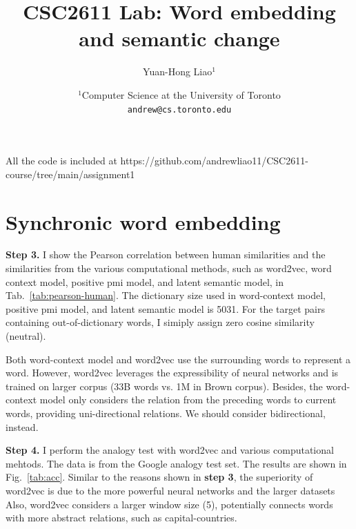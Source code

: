\documentclass[a4paper]{article}
\title{CSC2611 Lab: Word embedding and semantic change}
\author{Yuan-Hong Liao$^{1}$}
\date{
	$^1$Computer Science at the University of Toronto \\ \texttt{andrew@cs.toronto.edu}
}
\theoremstyle{plain}
\theoremstyle{definition}
\begin{document}
\maketitle


\noindent All the code is included at https://github.com/andrewliao11/CSC2611-course/tree/main/assignment1

\section{Synchronic word embedding}

\noindent\textbf{Step 3.}
I show the Pearson correlation between human similarities and the similarities from the various computational methods, such as word2vec, word context model, positive pmi model, and latent semantic model, in Tab.~\ref{tab:pearson-human}.
The dictionary size used in word-context model, positive pmi model, and latent semantic model is 5031. For the target pairs containing out-of-dictionary words, I simiply assign zero cosine similarity (neutral).

Both word-context model and word2vec use the surrounding words to represent a word. However, word2vec leverages the expressibility of neural networks and is trained on larger corpus (33B words vs. 1M in Brown corpus).
Besides, the word-context model only considers the relation from the preceding words to current words, providing uni-directional relations. We should consider bidirectional, instead.

\begin{table}[h]
\caption{Pearson correlation w.r.t. human similarities.}
\label{tab:pearson-human}
\end{table}


\noindent\textbf{Step 4.} I perform the analogy test with word2vec and various computational mehtods. The data is from the Google analogy test set. 
The results are shown in Fig.~\ref{tab:acc}. Similar to the reasons shown in \textbf{step 3}, the superiority of word2vec is due to the more powerful neural networks and the larger datasets
Also, word2vec considers a larger window size (5), potentially connects words with more abstract relations, such as capital-countries.
\end{document}
